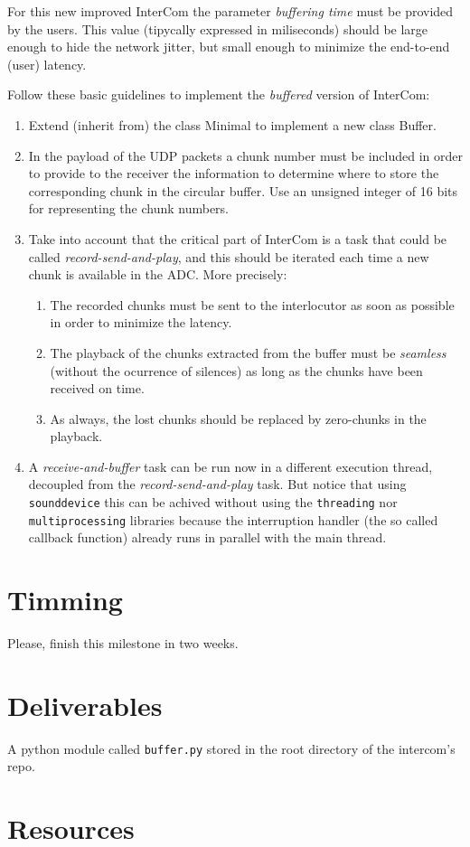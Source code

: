 For this new improved InterCom the parameter \emph{buffering time}
must be provided by the users. This value (tipycally expressed in
miliseconds) should be large enough to hide the network jitter, but
small enough to minimize the end-to-end (user) latency.

Follow these basic guidelines to implement the \emph{buffered} version
of InterCom:

\begin{enumerate}
\item Extend (inherit from) the class Minimal to implement a new class
  Buffer.
\item In the payload of the UDP packets a chunk number must be
  included in order to provide to the receiver the information to
  determine where to store the corresponding chunk in the circular
  buffer. Use an unsigned integer of 16 bits for representing the
  chunk numbers.
\item Take into account that the critical part of InterCom is a task
  that could be called \emph{record-send-and-play}, and this should be
  iterated each time a new chunk is available in the ADC. More
  precisely:
  \begin{enumerate}
  \item The recorded chunks must be sent to the interlocutor as soon
    as possible in order to minimize the latency.
  \item The playback of the chunks extracted from the buffer must be
    \emph{seamless} (without the ocurrence of silences) as long as the
    chunks have been received on time.
  \item As always, the lost chunks should be replaced by zero-chunks
    in the playback.
  \end{enumerate}
\item A \emph{receive-and-buffer} task can be run now in a different
  execution thread, decoupled from the \emph{record-send-and-play}
  task. But notice that using \texttt{sounddevice} this can be achived
  without using the \texttt{threading} nor \texttt{multiprocessing}
  libraries because the interruption handler (the so called callback
  function) already runs in parallel with the main thread.
\end{enumerate}



\section{Timming}

Please, finish this milestone in two weeks.

\section{Deliverables}

A python module called \texttt{buffer.py} stored in the root directory
of the intercom's repo.

\section{Resources}


